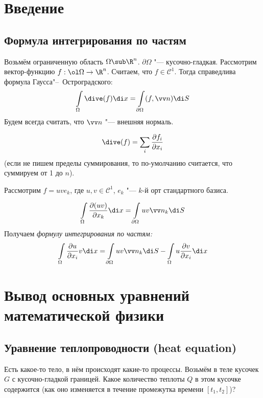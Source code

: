 \chapter{Введение}

\section{Формула интегрирования по частям}

Возьмём ограниченную область $ \Omega \sub \R^n $.
$ \partial \Omega $ "--- кусочно-гладкая.
Рассмотрим вектор-функцию $ f : \ol \Omega \to \R^n $.
Считаем, что $ f \in \mathcal C^1 $.
Тогда справедлива формула Гаусса"--~Остроградского:
$$ \int\limits_\Omega \dive(f) \di x = \int\limits_{\partial \Omega} (f, \vv n) \di S $$
Будем всегда считать, что $ \vv n $ "--- внешняя нормаль.

\begin{definition}
	$$ \dive(f) = \sum_i \frac{\partial f_i}{\partial x_i} $$
	(если не пишем пределы суммирования, то по-умолчанию считается, что суммируем от 1 до $ n $).
\end{definition}

Рассмотрим $ f = uve_k $, где $ u, v \in \mathcal C^1 $, $ e_k $ "--- $ k $-й орт стандартного
базиса.

$$ \int\limits_\Omega \frac{\partial(uv)}{\partial x_k} \di x =
\int\limits_{\partial \Omega} uv \vv n_k \di S $$
Получаем \emph{формулу интегрирования по частям:}
$$ \int\limits_\Omega \frac{\partial u}{\partial x_i} v \di x =
\int\limits_{\partial \Omega} uv \vv n_k \di S -
\int\limits_\Omega u \frac{\partial v}{\partial x_i} \di x $$

\chapter{Вывод основных уравнений математической физики}

\section{Уравнение теплопроводности (heat equation)}

\begin{problem}
	Есть какое-то тело, в нём происходят какие-то процессы.
	Возьмём в теле кусочек $ G $ с кусочно-гладкой границей.
	Какое количество теплоты $ Q $ в этом кусочке содержится (как оно изменяется в течение
	промежутка времени $ [t_1, t_2] $)?
\end{problem}

